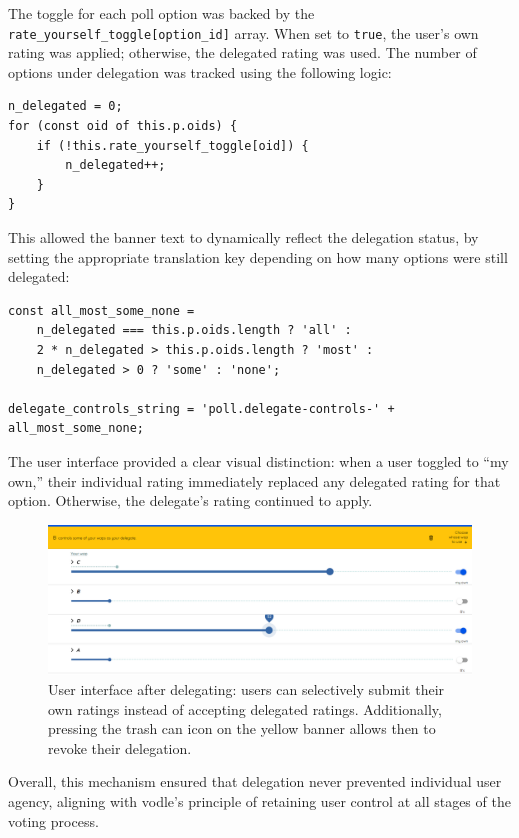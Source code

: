 The toggle for each poll option was backed by the \texttt{rate\_yourself\_toggle[option\_id]} array. When set to \texttt{true}, the user's own rating was applied; otherwise, the delegated rating was used. The number of options under delegation was tracked using the following logic:

\begin{verbatim}
n_delegated = 0;
for (const oid of this.p.oids) {
    if (!this.rate_yourself_toggle[oid]) {
        n_delegated++;
    }
}
\end{verbatim}

This allowed the banner text to dynamically reflect the delegation status, by setting the appropriate translation key depending on how many options were still delegated:

\begin{verbatim}
const all_most_some_none = 
    n_delegated === this.p.oids.length ? 'all' : 
    2 * n_delegated > this.p.oids.length ? 'most' :
    n_delegated > 0 ? 'some' : 'none';

delegate_controls_string = 'poll.delegate-controls-' + all_most_some_none;
\end{verbatim}

The user interface provided a clear visual distinction: when a user toggled to ``my own,'' their individual rating immediately replaced any delegated rating for that option. Otherwise, the delegate's rating continued to apply.

\begin{figure}[H]
    \centering
    \includegraphics[width=\linewidth]{../common/vodle_screenshots/override.png}
    \caption{User interface after delegating: users can selectively submit their own ratings instead of accepting delegated ratings. Additionally, pressing the trash can icon on the yellow banner allows then to revoke their delegation.}
    \label{fig:vote_override}
\end{figure}

Overall, this mechanism ensured that delegation never prevented individual user agency, aligning with vodle's principle of retaining user control at all stages of the voting process.



